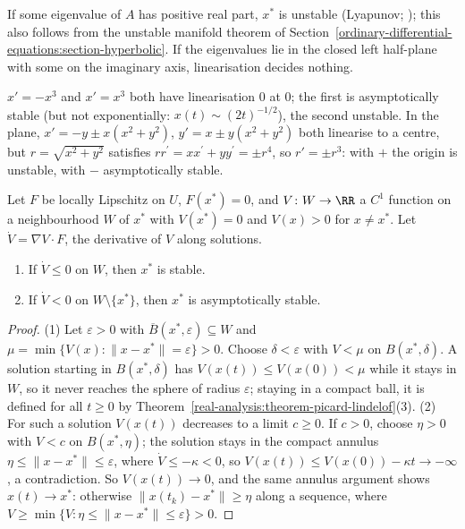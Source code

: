 If some eigenvalue of $A$ has positive real part, $x^*$ is unstable (Lyapunov; \cite[Chapter 2]{teschl-ode}); this also follows from the unstable manifold theorem of Section~\ref{ordinary-differential-equations:section-hyperbolic}. If
the eigenvalues lie in the closed left half-plane with some on the imaginary axis, linearisation decides nothing.

\begin{counterexample}\label{ordinary-differential-equations:counterexample-linearisation}
$x' = -x^3$ and $x' = x^3$ both have linearisation $0$ at $0$; the first is asymptotically stable (but not exponentially: $x(t) \sim (2t)^{-1/2}$), the second unstable. In the plane, $x' = -y \pm x(x^2 + y^2)$, $y' = x \pm y(x^2 + y^2)$
both linearise to a centre, but $r = \sqrt{x^2 + y^2}$ satisfies $rr^{\prime} = xx^{\prime} + yy^{\prime} = \pm r^4$, so $r' = \pm r^3$: with $+$ the origin is unstable, with $-$ asymptotically stable.
\end{counterexample}

\begin{theorem}\label{ordinary-differential-equations:theorem-lyapunov}
Let $F$ be locally Lipschitz on $U$, $F(x^*) = 0$, and $V \colon W \to \RR$ a $C^1$ function on a neighbourhood $W$ of $x^*$ with $V(x^*) = 0$ and $V(x) > 0$ for $x \neq x^*$. Let $\dot V = \nabla V \cdot F$, the derivative of $V$
along solutions.
\begin{enumerate}
\item If $\dot V \leq 0$ on $W$, then $x^*$ is stable.
\item If $\dot V < 0$ on $W \setminus \{x^*\}$, then $x^*$ is asymptotically stable.
\end{enumerate}
\end{theorem}

\begin{proof}
(1) Let $\varepsilon > 0$ with $\overline{B}(x^*, \varepsilon) \subseteq W$ and $\mu = \min\{V(x) : \|x - x^*\| = \varepsilon\} > 0$. Choose $\delta < \varepsilon$ with $V < \mu$ on $B(x^*, \delta)$. A solution starting in $B(x^*, \delta)$ has
$V(x(t)) \leq V(x(0)) < \mu$ while it stays in $W$, so it never reaches the sphere of radius $\varepsilon$; staying in a compact ball, it is defined for all $t \geq 0$ by Theorem~\ref{real-analysis:theorem-picard-lindelof}(3).
(2) For such a solution $V(x(t))$ decreases to a limit $c \geq 0$. If $c > 0$, choose $\eta > 0$ with $V < c$ on $B(x^*, \eta)$; the solution stays in the compact annulus $\eta \leq \|x - x^*\| \leq \varepsilon$, where $\dot V \leq -\kappa < 0$, so
$V(x(t)) \leq V(x(0)) - \kappa t \to -\infty$, a contradiction. So $V(x(t)) \to 0$, and the same annulus argument shows $x(t) \to x^*$: otherwise $\|x(t_k) - x^*\| \geq \eta$ along a sequence, where $V \geq \min\{V : \eta \leq \|x - x^*\| \leq \varepsilon\} > 0$.
\end{proof}

